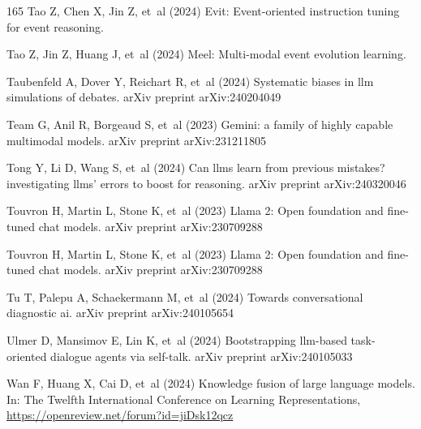 \documentclass[sn-basic, Numbered]{sn-jnl}%
\theoremstyle{thmstyleone}%
\theoremstyle{thmstyletwo}%
\theoremstyle{thmstylethree}%
\begin{document}
\begin{thebibliography}{165}
Tao Z, Chen X, Jin Z, et~al (2024{}) Evit: Event-oriented instruction tuning for event reasoning. 

Tao Z, Jin Z, Huang J, et~al (2024{}) Meel: Multi-modal event evolution learning. 

Taubenfeld A, Dover Y, Reichart R, et~al (2024) Systematic biases in llm simulations of debates. arXiv preprint arXiv:240204049

Team G, Anil R, Borgeaud S, et~al (2023) Gemini: a family of highly capable multimodal models. arXiv preprint arXiv:231211805

Tong Y, Li D, Wang S, et~al (2024) Can llms learn from previous mistakes? investigating llms' errors to boost for reasoning. arXiv preprint arXiv:240320046

Touvron H, Martin L, Stone K, et~al (2023{}) Llama 2: Open foundation and fine-tuned chat models. arXiv preprint arXiv:230709288

Touvron H, Martin L, Stone K, et~al (2023{}) Llama 2: Open foundation and fine-tuned chat models. arXiv preprint arXiv:230709288

Tu T, Palepu A, Schaekermann M, et~al (2024) Towards conversational diagnostic ai. arXiv preprint arXiv:240105654

Ulmer D, Mansimov E, Lin K, et~al (2024) Bootstrapping llm-based task-oriented dialogue agents via self-talk. arXiv preprint arXiv:240105033

Wan F, Huang X, Cai D, et~al (2024) Knowledge fusion of large language models. In: The Twelfth International Conference on Learning Representations, \urlprefix\url{https://openreview.net/forum?id=jiDsk12qcz}


\end{thebibliography}
\end{document}
